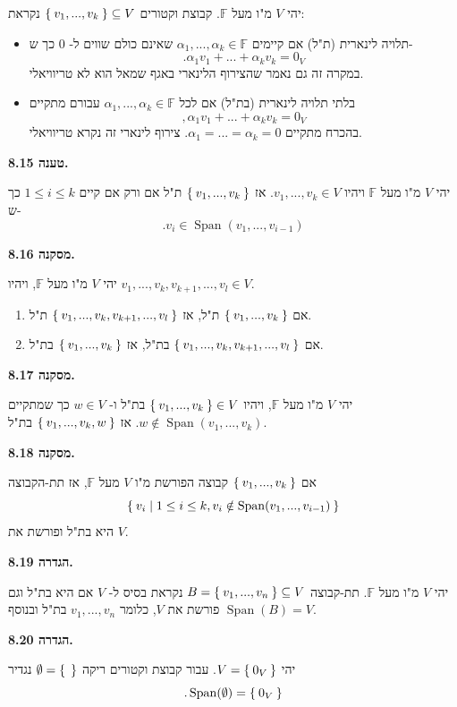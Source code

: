 \documentclass[12pt]{report}
\theoremstyle{plain}
\theoremstyle{definition}
\newcommand{\F}{\mathbb{F}}
\newcommand{\0}{\mathbf{0}}
\DeclareMathOperator{\Span}{Span}
\begin{document}
יהי 
$V$
מ"ו מעל
$\F$.
קבוצת וקטורים
$\Set{v_1,...,v_k}\subseteq V$
נקראת:
\begin{itemize}
\item 
תלויה לינארית (ת"ל) אם קיימים 
$\alpha_1,...,\alpha_k\in\F$
שאינם כולם שווים ל-
$0$
כך ש-
$$
.\alpha_1v_1+...+\alpha_kv_k=0_V
$$
במקרה זה גם נאמר שהצירוף הלינארי באגף שמאל הוא לא טריוויאלי.
\item
בלתי תלויה לינארית (בת"ל) אם לכל
$\alpha_1,...,\alpha_k\in\F$
עבורם מתקיים
$$
,\alpha_1v_1+...+\alpha_kv_k=0_V
$$
בהכרח מתקיים
$\alpha_1=...=\alpha_k=0$.
צירוף לינארי זה נקרא טריוויאלי.
\end{itemize}
\bigskip
\bigskip

\noindent\textbf{טענה 8.15.}

יהי 
$V$
מ"ו מעל
$\F$
ויהיו
$v_1,...,v_k\in V$.
אז
$\Set{v_1,...,v_k}$
ת"ל אם ורק אם קיים
$1\leq i\leq k$
כך ש-
$$
.v_i\in\Span(v_1,...,v_{i-1})
$$
\bigskip
\bigskip

\noindent\textbf{מסקנה 8.16.}

יהי
$V$
מ"ו מעל
$\F$,
ויהיו
$v_1,...,v_k,v_{k+1},...,v_l\in V$.
\begin{enumerate}[label=\alph*.]
\item 
אם 
$\Set{v_1,...,v_k}$
ת"ל, אז
$\Set{v_1,...,v_k,v_{k+1},...,v_l}$
ת"ל.
\item 
אם 
$\Set{v_1,...,v_k,v_{k+1},...,v_l}$
בת"ל, אז
$\Set{v_1,...,v_k}$
בת"ל.
\end{enumerate}
\bigskip
\bigskip

\noindent\textbf{מסקנה 8.17.}

יהי
$V$
מ"ו מעל
$\F$,
ויהיו
$\Set{v_1,...,v_k}\in V$
בת"ל ו-
$w\in V$
כך שמתקיים
$w\notin\Span(v_1,...,v_k)$.
אז
$\Set{v_1,...,v_k,w}$
בת"ל.
\bigskip
\bigskip

\noindent\textbf{מסקנה 8.18.}

אם
$\Set{v_1,...,v_k}$
קבוצה הפורשת מ"ו
$V$
מעל
$\F$,
אז תת-הקבוצה
$$
\Set{v_i|1\leq i\leq k, v_i\notin\Span(v_1,...,v_{i-1})}
$$
היא בת"ל ופורשת את 
$V$.
\bigskip
\bigskip

\noindent\textbf{הגדרה 8.19.}

יהי
$V$
מ"ו מעל
$\F$.
תת-קבוצה
$B=\Set{v_1,...,v_n}\subseteq V$
נקראת בסיס ל-
$V$
אם היא בת"ל וגם פורשת את 
$V$,
כלומר
$v_1,...,v_n$
בת"ל ובנוסף 
$\Span(B)=V$.
\bigskip
\bigskip

\noindent\textbf{הגדרה 8.20.}

יהי
$V=\Set{0_V}$.
עבור קבוצת וקטורים ריקה
$\emptyset=\Set{ }$
נגדיר 
$$
.\Span(\emptyset)=\Set{0_V}
$$
\bigskip
\bigskip
\end{document}
